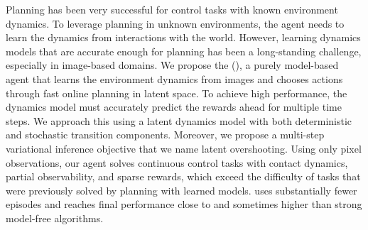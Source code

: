 Planning has been very successful for control tasks with known environment dynamics. To leverage planning in unknown environments, the agent needs to learn the dynamics from interactions with the world. However, learning dynamics models that are accurate enough for planning has been a long-standing challenge, especially in image-based domains. We propose the \fullmethod (\method), a purely model-based agent that learns the environment dynamics from images and chooses actions through fast online planning in latent space. To achieve high performance, the dynamics model must accurately predict the rewards ahead for multiple time steps. We approach this using a latent dynamics model with both deterministic and stochastic transition components. Moreover, we propose a multi-step variational inference objective that we name latent overshooting. Using only pixel observations, our agent solves continuous control tasks with contact dynamics, partial observability, and sparse rewards, which exceed the difficulty of tasks that were previously solved by planning with learned models. \method uses substantially fewer episodes and reaches final performance close to and sometimes higher than strong model-free algorithms.